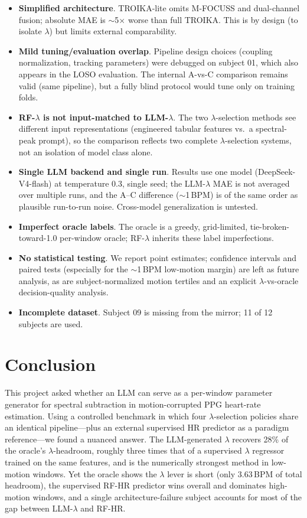 \documentclass[sigconf,nonacm,11pt]{acmart}
\begin{document}
\begin{itemize}
\item \textbf{Simplified architecture}. TROIKA-lite omits M-FOCUSS and dual-channel fusion; absolute MAE is $\sim$5$\times$ worse than full TROIKA. This is by design (to isolate $\lambda$) but limits external comparability.
\item \textbf{Mild tuning/evaluation overlap}. Pipeline design choices (coupling normalization, tracking parameters) were debugged on subject 01, which also appears in the LOSO evaluation. The internal A-vs-C comparison remains valid (same pipeline), but a fully blind protocol would tune only on training folds.
\item \textbf{RF-$\lambda$ is not input-matched to LLM-$\lambda$}. The two $\lambda$-selection methods see different input representations (engineered tabular features vs.\ a spectral-peak prompt), so the comparison reflects two complete $\lambda$-selection systems, not an isolation of model class alone.
\item \textbf{Single LLM backend and single run}. Results use one model (DeepSeek-V4-flash) at temperature 0.3, single seed; the LLM-$\lambda$ MAE is not averaged over multiple runs, and the A--C difference ($\sim$1\,BPM) is of the same order as plausible run-to-run noise. Cross-model generalization is untested.
\item \textbf{Imperfect oracle labels}. The oracle is a greedy, grid-limited, tie-broken-toward-1.0 per-window oracle; RF-$\lambda$ inherits these label imperfections.
\item \textbf{No statistical testing}. We report point estimates; confidence intervals and paired tests (especially for the $\sim$1\,BPM low-motion margin) are left as future analysis, as are subject-normalized motion tertiles and an explicit $\lambda$-vs-oracle decision-quality analysis.
\item \textbf{Incomplete dataset}. Subject 09 is missing from the mirror; 11 of 12 subjects are used.
\end{itemize}

\section{Conclusion}
\label{sec:conclusion}

This project asked whether an LLM can serve as a per-window parameter generator for spectral subtraction in motion-corrupted PPG heart-rate estimation. Using a controlled benchmark in which four $\lambda$-selection policies share an identical pipeline---plus an external supervised HR predictor as a paradigm reference---we found a nuanced answer. The LLM-generated $\lambda$ recovers 28\% of the oracle's $\lambda$-headroom, roughly three times that of a supervised $\lambda$ regressor trained on the same features, and is the numerically strongest method in low-motion windows. Yet the oracle shows the $\lambda$ lever is short (only 3.63\,BPM of total headroom), the supervised RF-HR predictor wins overall and dominates high-motion windows, and a single architecture-failure subject accounts for most of the gap between LLM-$\lambda$ and RF-HR.
\end{document}
